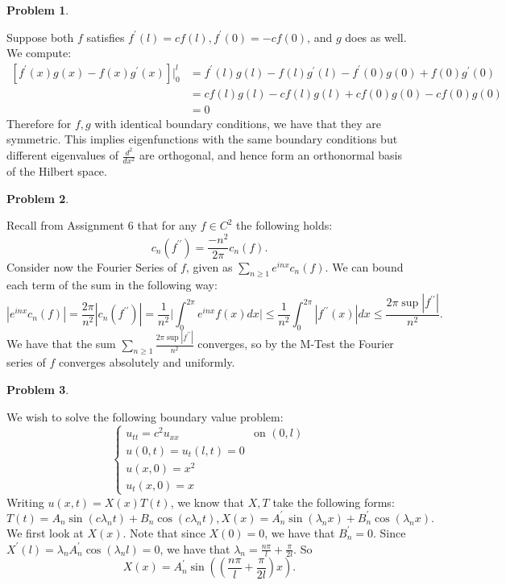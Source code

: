 \documentclass[12pt, a4paper]{article}
\title{}
\author{A.N.}
\date{\today}
\newtheorem{problem}{Problem}
\theoremstyle{definition}
\begin{document}
	
	
	
	\begin{problem}
	\end{problem}
	Suppose both $f$ satisfies $f^\prime(l) =cf(l), f^\prime(0) = - cf(0)$, and $g$ does as well.  We compute:
	\begin{align*}
		\left[f^\prime(x) g(x) - f(x)g^\prime(x)\right] \Big|_0^l& = f^\prime(l)g(l) - f(l)g^\prime(l)- f^\prime(0)g(0) + f(0)g^\prime(0)
		\\ & = cf(l)g(l)-cf(l)g(l)+ cf(0)g(0)- cf(0)g(0)
		\\ & = 0
	\end{align*}
	Therefore for $f,g$ with identical boundary conditions, we have that they are symmetric. This implies eigenfunctions with the same boundary conditions but different eigenvalues of $\frac{d^2}{dx^2}$ are orthogonal, and hence form an orthonormal basis of the Hilbert space.
	\newpage
	\begin{problem}
	\end{problem}
	Recall from Assignment 6 that for any $f\in C^2$ the following holds: $$c_n(f^{\prime \prime}) = \frac{-n^2}{2\pi} c_n(f).$$
	Consider now the Fourier Series of $f$, given as $\sum_{n\geq 1}e^{inx}c_n(f)$. We can bound each term of the sum in the following way:
	$$|e^{inx}c_n(f)| = \frac{2\pi}{n^2}|c_n(f^{\prime \prime})| = \frac{1}{n^2} \Big|\int_0^{2\pi } e^{inx}f(x) dx
	\Big| \leq \frac{1}{n^2} \int_0^{2\pi} |f^{\prime \prime}(x)|dx \leq \frac{2\pi \sup|f^{\prime \prime}|}{n^2}.$$
	We have that the sum $\sum_{n\geq 1} \frac{2\pi \sup |f^{\prime \prime}|}{n^2}$ converges, so by the M-Test the Fourier series of $f$ converges absolutely and uniformly.
	\newpage
	\begin{problem}
	\end{problem}
	We wish to solve the following boundary value problem:
	$$\begin{cases}
		u_{tt} = c^2u_{xx} &\text{on $(0,l)$}\\
		u(0,t) = u_t(l,t) = 0 \\
		u(x,0)=x^2\\
		u_t(x,0) = x
	\end{cases}$$
	Writing $u(x,t) = X(x)T(t)$, we know that $X,T$ take the following forms:
	$$T(t) = A_n \sin(c\lambda_n t) + B_n \cos (c \lambda_n t), X(x) = A_n^\prime \sin(\lambda_n x) + B_n^\prime \cos(\lambda_n x).$$
	We first look at $X(x)$. Note that since $X(0)=0$, we have that $B_n^\prime = 0$. Since $X^\prime(l)= \lambda_n A^\prime_n \cos(\lambda_n l) = 0$, we have that $\lambda_n = \frac{n\pi}{l} + \frac{\pi}{2l}$. So $$X(x) = A_n^\prime \sin \left(\left(\frac{n\pi}{l} + \frac{\pi}{2l}\right)x \right).$$
	
\end{document}
